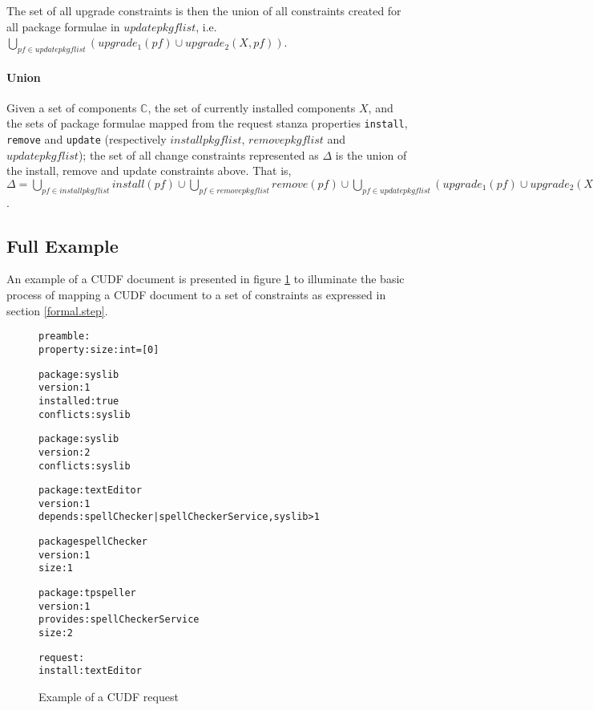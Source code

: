 The set of all upgrade constraints is then the union of all constraints created for all package formulae in $updatepkgflist$,
i.e. $\bigcup \limits_{pf \in updatepkgflist} (upgrade_1(pf) \cup upgrade_2(X,pf))$.

\paragraph{Union}
Given a set of components $\mathbb{C}$, the set of currently installed components $X$,
and the sets of package formulae mapped from the request stanza properties \verb+install+, \verb+remove+ and \verb+update+ 
(respectively $installpkgflist$, $removepkgflist$ and $updatepkgflist$);
the set of all change constraints represented as $\Delta$ is the union of the install, remove and update constraints above.
That is, $\Delta = \bigcup \limits_{pf \in installpkgflist} install(pf) 
\cup \bigcup \limits_{pf \in removepkgflist} remove(pf) 
\cup \bigcup \limits_{pf \in updatepkgflist} (upgrade_1(pf) \cup upgrade_2(X,pf))$.


\subsection{Full Example}
\label{formal.example}
An example of a CUDF document is presented in figure \ref{formal.CUDFEXAMPLE} to illuminate the basic process of mapping a CUDF document to a set of constraints as expressed in section \ref{formal.step}.

\begin{figure}[htp] 
\begin{center}
\begin{alltt}
preamble:
property: size: int = [0]

package: syslib
version: 1
installed: true
conflicts: syslib

package: syslib
version: 2
conflicts: syslib

package: textEditor
version: 1
depends: spellChecker | spellCheckerService, syslib > 1

package spellChecker
version: 1
size: 1

package: tpspeller
version: 1
provides: spellCheckerService
size: 2

request:
install:textEditor

\end{alltt}
  \caption[CUDF Example]{Example of a CUDF request}
  \label{formal.CUDFEXAMPLE}
\end{center}
\end{figure} 

